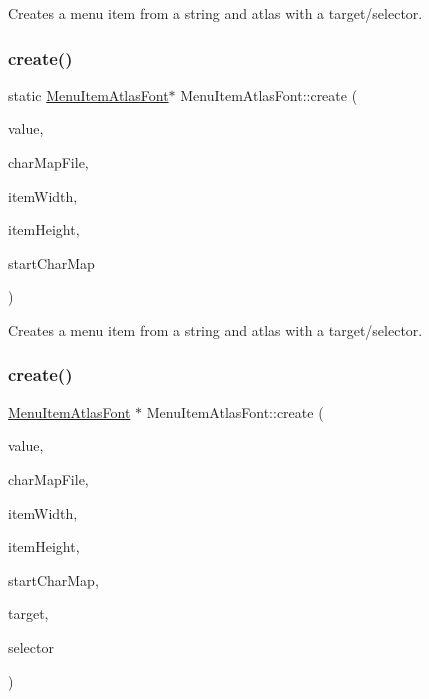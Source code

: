 Creates a menu item from a string and atlas with a target/selector. \mbox{\label{classMenuItemAtlasFont_a3aac957b70f89ef5f03cfd05b67c7ec4}} 
\subsubsection{\texorpdfstring{create()}{create()}\hspace{0.1cm}{\footnotesize\ttfamily [2/6]}}
{\footnotesize\ttfamily static \hyperlink{classMenuItemAtlasFont}{Menu\+Item\+Atlas\+Font}$\ast$ Menu\+Item\+Atlas\+Font\+::create (\begin{DoxyParamCaption}\item[{const std\+::string \&}]{value,  }\item[{const std\+::string \&}]{char\+Map\+File,  }\item[{int}]{item\+Width,  }\item[{int}]{item\+Height,  }\item[{char}]{start\+Char\+Map }\end{DoxyParamCaption})\hspace{0.3cm}{\ttfamily [static]}}

Creates a menu item from a string and atlas with a target/selector. \mbox{\label{classMenuItemAtlasFont_a2b7dfd0d03ff09af3cfa6656c2f7a096}} 
\subsubsection{\texorpdfstring{create()}{create()}\hspace{0.1cm}{\footnotesize\ttfamily [3/6]}}
{\footnotesize\ttfamily \hyperlink{classMenuItemAtlasFont}{Menu\+Item\+Atlas\+Font} $\ast$ Menu\+Item\+Atlas\+Font\+::create (\begin{DoxyParamCaption}\item[{const std\+::string \&}]{value,  }\item[{const std\+::string \&}]{char\+Map\+File,  }\item[{int}]{item\+Width,  }\item[{int}]{item\+Height,  }\item[{char}]{start\+Char\+Map,  }\item[{\hyperlink{classRef}{Ref} $\ast$}]{target,  }\item[{S\+E\+L\+\_\+\+Menu\+Handler}]{selector }\end{DoxyParamCaption})\hspace{0.3cm}{\ttfamily [static]}}

